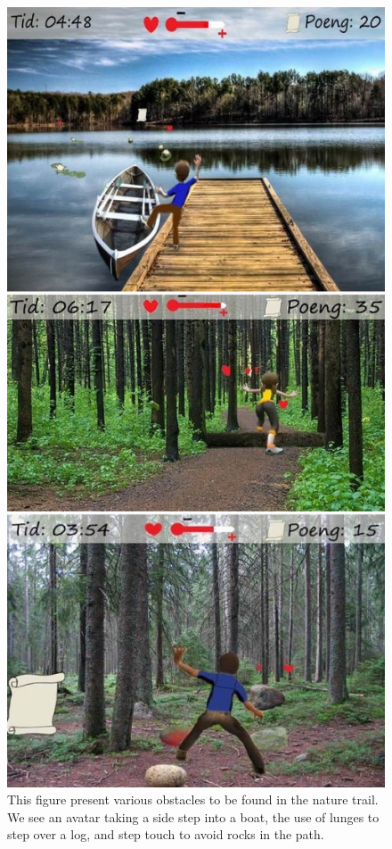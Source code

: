 \begin{figure} [H]
\centering
\includegraphics[scale=0.45]{hindring2.jpg}
\caption[Nature trail - obstacles, part two]{This figure present various obstacles to be found in the nature trail. We see an avatar taking a side step into a boat, the use of lunges to step over a log, and step touch to avoid rocks in the path.}
\label{fig:hindring2}
\end{figure}

